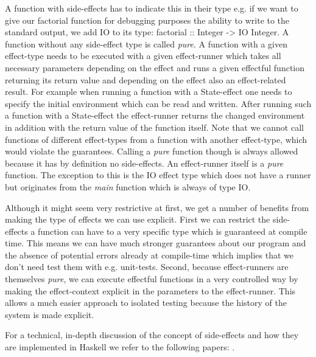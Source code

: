 A function with side-effects has to indicate this in their type e.g. if we want to give our factorial function for debugging purposes the ability to write to the standard output, we add IO to its type: factorial :: Integer -> IO Integer. A function without any side-effect type is called \textit{pure}. A function with a given effect-type needs to be executed with a given effect-runner which takes all necessary parameters depending on the effect and runs a given effectful function returning its return value and depending on the effect also an effect-related result. For example when running a function with a State-effect one needs to specify the initial environment which can be read and written. After running such a function with a State-effect the effect-runner returns the changed environment in addition with the return value of the function itself. Note that we cannot call functions of different effect-types from a function with another effect-type, which would violate the guarantees. Calling a \textit{pure} function though is always allowed because it has by definition no side-effects. An effect-runner itself is a \textit{pure} function. The exception to this is the IO effect type which does not have a runner but originates from the \textit{main} function which is always of type IO.

Although it might seem very restrictive at first, we get a number of benefits from making the type of effects we can use explicit. First we can restrict the side-effects a function can have to a very specific type which is guaranteed at compile time. This means we can have much stronger guarantees about our program and the absence of potential errors already at compile-time which implies that we don't need test them with e.g. unit-tests. Second, because effect-runners are themselves \textit{pure}, we can execute effectful functions in a very controlled way by making the effect-context explicit in the parameters to the effect-runner. This allows a much easier approach to isolated testing because the history of the system is made explicit.

For a technical, in-depth discussion of the concept of side-effects and how they are implemented in Haskell we refer to the following papers: \citep{moggi_computational_1989, wadler_essence_1992, wadler_monads_1995, wadler_how_1997, jones_tackling_2002}.

